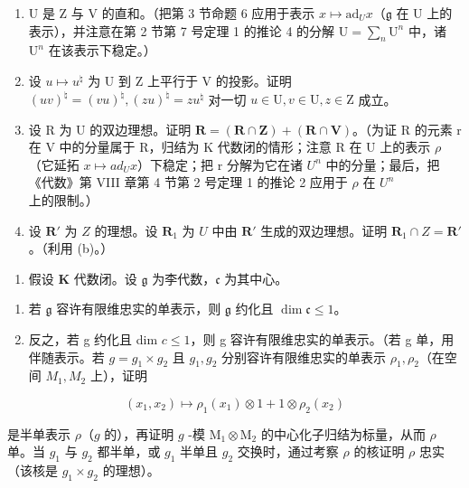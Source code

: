 \begin{enumerate}
\def\labelenumi{(\alph{enumi})}
\item
  U 是 Z 与 V 的直和。（把第 3 节命题 6 应用于表示 \(x \mapsto \mathrm{ad}_U x\)（\(\mathfrak{g}\) 在 U 上的表示），并注意在第 2 节第 7 号定理 1 的推论 4 的分解 \(\mathrm{U} = \sum_{n} \mathrm{U}^n\) 中，诸 \(\mathrm{U}^n\) 在该表示下稳定。）
\item
  设 \(u \mapsto u^{\natural}\) 为 U 到 Z 上平行于 V 的投影。证明 \((uv)^{\natural} = (vu)^{\natural}, (zu)^{\natural} = zu^{\natural}\) 对一切 \(u \in \mathrm{U}, v \in \mathrm{U}, z \in \mathrm{Z}\) 成立。
\item
  设 R 为 U 的双边理想。证明 \(\mathbf{R} = (\mathbf{R} \cap \mathbf{Z}) + (\mathbf{R} \cap \mathbf{V})\)。（为证 R 的元素 r 在 V 中的分量属于 R，归结为 K 代数闭的情形；注意 R 在 U 上的表示 \(\rho\)（它延拓 \(x \mapsto ad_{U}x\)）下稳定；把 r 分解为它在诸 \(U^{n}\) 中的分量；最后，把《代数》第 VIII 章第 4 节第 2 号定理 1 的推论 2 应用于 \(\rho\) 在 \(U^{n}\) 上的限制。）
\item
  设 \(\mathbf{R}'\) 为 \(Z\) 的理想。设 \(\mathbf{R}_1\) 为 \(U\) 中由 \(\mathbf{R}'\) 生成的双边理想。证明 \(\mathbf{R}_1 \cap Z = \mathbf{R}'\)。（利用 (b)。）
\end{enumerate}

\begin{enumerate}
\def\labelenumi{\arabic{enumi}.}
\setcounter{enumi}{19}
\tightlist
\item
  假设 \(\mathbf{K}\) 代数闭。设 \(\mathfrak{g}\) 为李代数，\(\mathfrak{c}\) 为其中心。
\end{enumerate}

\begin{enumerate}
\def\labelenumi{(\alph{enumi})}
\item
  若 \(\mathfrak{g}\) 容许有限维忠实的单表示，则 \(\mathfrak{g}\) 约化且 \(\dim \mathfrak{c} \leqslant 1\)。
\item
  反之，若 g 约化且 dim \(c \leqslant 1\)，则 g 容许有限维忠实的单表示。（若 g 单，用伴随表示。若 \(g = g_{1} \times g_{2}\) 且 \(g_{1}, g_{2}\) 分别容许有限维忠实的单表示 \(\rho_{1}, \rho_{2}\)（在空间 \(M_{1}, M_{2}\) 上），证明
\end{enumerate}

\[
(x _ {1}, x _ {2}) \mapsto \rho_ {1} (x _ {1}) \otimes 1 + 1 \otimes \rho_ {2} (x _ {2})
\]

是半单表示 \(\rho\)（\(g\) 的），再证明 \(g\) -模 \(\mathrm{M}_1 \otimes \mathrm{M}_2\) 的中心化子归结为标量，从而 \(\rho\) 单。当 \(g_1\) 与 \(g_2\) 都半单，或 \(g_1\) 半单且 \(g_2\) 交换时，通过考察 \(\rho\) 的核证明 \(\rho\) 忠实（该核是 \(g_1 \times g_2\) 的理想）。


